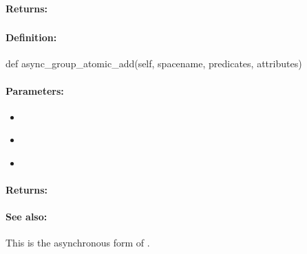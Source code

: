 \paragraph{Returns:}


\pagebreak
\subsubsection{}
\label{api:python:async_group_atomic_add}


\paragraph{Definition:}
\begin{pythoncode}
def async_group_atomic_add(self, spacename, predicates, attributes)
\end{pythoncode}

\paragraph{Parameters:}
\begin{itemize}[noitemsep]
\item {}\\

\item {}\\

\item {}\\

\end{itemize}

\paragraph{Returns:}


\paragraph{See also:}  This is the asynchronous form of .

\pagebreak
